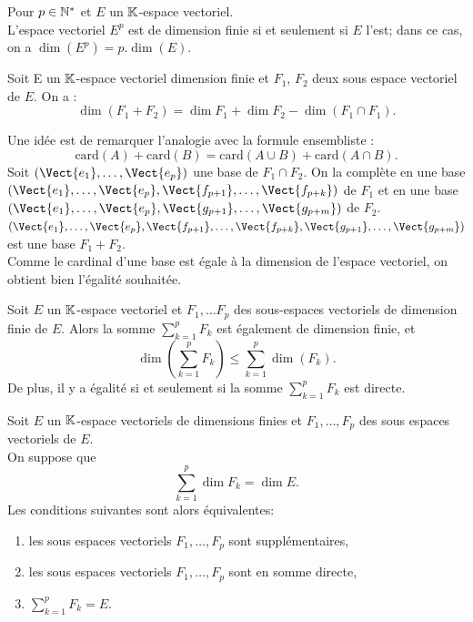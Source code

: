 \documentclass{book}
\begin{document}
\begin{Corollaire}
Pour $p\in \mathbb{N}^*$ et $E$ un $\mathbb{K} $-espace vectoriel.\\
L'espace vectoriel $E^p$ est de dimension finie si et seulement si $E$ l'est;
dans ce cas, on a $\dim(E^p) = p.\dim(E)$.
\end{Corollaire}
\begin{Proposition}
Soit E un $\mathbb{K} $-espace vectoriel dimension finie et $F_1$, $F_2$ deux sous espace vectoriel de $E$. On a :
$$\dim (F_1 + F_2) = \dim F_1 + \dim F_2 - \dim(F_1 \cap F_1).$$
\end{Proposition}
\begin{Demonstration}
Une idée est de remarquer l'analogie avec la formule ensembliste  :
$$\text{card}(A)+\text{card}(B)=\text{card}(A\cup B)+\text{card}(A\cap B).$$
Soit $(\Vect{e_1},\dots,\Vect{e_p})$ une base de $F_1\cap F_2$. On la complète en une base 
$(\Vect{e_1},\dots,\Vect{e_p},\Vect{f_{p+1}},\dots,\Vect{f_{p+k}})$ de $F_1$ et en une base $(\Vect{e_1},\dots,\Vect{e_p},\Vect{g_{p+1}},\dots,\Vect{g_{p+m}})$ de $F_2$. $(\Vect{e_1},\dots,\Vect{e_p},\Vect{f_{p+1}},\dots,\Vect{f_{p+k}},\Vect{g_{p+1}},\dots,\Vect{g_{p+m}})$ est une base   $F_1+F_2$.\\
Comme le cardinal d'une base est égale à la dimension de l'espace vectoriel, on obtient bien l'égalité souhaitée.
\end{Demonstration}
\begin{Proposition}
Soit $E$ un $\mathbb{K} $-espace vectoriel et $F_1,\dots F_p$ des sous-espaces vectoriels de dimension finie de $E$.
Alors la somme $\sum_{k=1}^p F_k$ est également de dimension finie, et
\[ \dim\left(\sum_{k=1}^p F_k \right)  \leq \sum_{k=1}^p \dim(F_k). \]
De plus, il y a égalité si et seulement si la somme $\sum_{k=1}^p F_k$ est directe.
\end{Proposition}
\begin{Proposition}
Soit $E$ un $\mathbb{K} $-espace vectoriels de dimensions finies et $F_1, \dots, F_p$ des sous espaces vectoriels de $E$.\\
On suppose que \[ \sum_{k=1}^p \dim F_k = \dim E. \]
Les conditions suivantes sont alors équivalentes:
\begin{enumerate}
\item
 les sous espaces vectoriels $F_1, \dots, F_p$ sont supplémentaires,
\item
  les sous espaces vectoriels $F_1, \dots, F_p$ sont en somme directe,
\item  $\sum_{k=1}^p F_k = E$.
\end{enumerate}
\end{Proposition}
\end{document}
